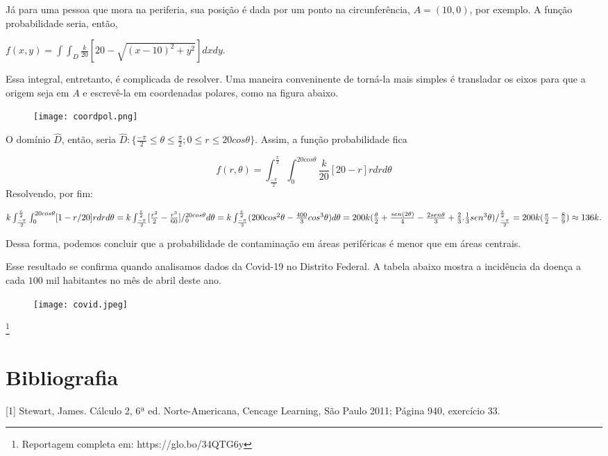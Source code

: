 \documentclass[a4paper]{article}
\begin{document}
Já para uma pessoa que mora na periferia, sua posição é dada por um ponto na circunferência, $A=(10,0)$, por exemplo. A função probabilidade seria, então, \newline

$ f(x,y)= \int\int_D \frac{k}{20}[20-\sqrt{(x-10)^2+y^2}]dxdy$.\newline

Essa integral, entretanto, é complicada de resolver.\newline
Uma maneira conveninente de torná-la mais simples é transladar os eixos para que a origem seja em $A$ e escrevê-la em coordenadas polares, como na figura abaixo.

\begin{figure}[htb!]
    \centering
    \texttt{[image: coordpol.png]}
\end{figure}

O domínio $\widehat{D}$, então, seria $\widehat{D}:\{ \frac{-\pi}{2}\leq \theta \leq \frac{\pi}{2}; 0\leq r\leq 20cos\theta \}$. Assim, a função probabilidade fica\newline

\begin{equation}
    f(r,\theta)= \int_{\frac{-\pi}{2}}^{\frac{\pi}{2}}\int_0^{20cos\theta}\frac{k}{20}[20-r]rdrd\theta
\end{equation}\newline
Resolvendo, por fim:\newline

$
    k\int_{\frac{-\pi}{2}}^{\frac{\pi}{2}}\int_0^{20cos\theta}[1-r/20]rdrd\theta=
    k\int_{\frac{-\pi}{2}}^{\frac{\pi}{2}}[\frac{r^2}{2}-\frac{r^3}{60}]/_0^{20cos\theta}d\theta=\newline
    k\int_{\frac{-\pi}{2}}^{\frac{\pi}{2}}(200cos^2\theta-\frac{400}{3}cos^3\theta)d\theta=200k(\frac{\theta}{2}+\frac{sen(2\theta)}{4}-\frac{2sen\theta}{3}+\frac{2}{3}.\frac{1}{3}sen^3\theta)/_{\frac{-\pi}{2}}^{\frac{\pi}{2}}=\newline
    200k(\frac{\pi}{2}-\frac{8}{9})\approx136k.
$\newline

Dessa forma, podemos concluir que a probabilidade de contaminação em áreas periféricas é menor que em áreas centrais.\newpage

Esse resultado se confirma quando analisamos dados da Covid-19 no Distrito Federal. A tabela abaixo mostra a incidência da doença a cada $100$ mil habitantes no mês de abril deste ano.\newline

\begin{figure}[htb!]
    \centering
    \texttt{[image: covid.jpeg]}
\end{figure}

 \footnote{Reportagem completa em: https://glo.bo/34QTG6y}\newpage

\section{Bibliografia}
[1] Stewart, James. Cálculo 2, 6ª ed. Norte-Americana, Cencage Learning, São Paulo 2011; Página 940, exercício 33.
\end{document}
